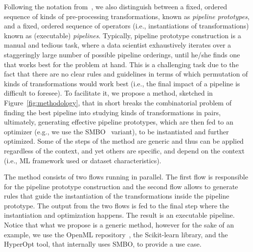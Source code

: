 Following the notation from~\cite{Quemy20InfSystems}, we also distinguish between a fixed, ordered sequence of kinds of pre-processing transformations, known as \textit{pipeline prototypes}, and a fixed, ordered sequence of operators (i.e., instantiations of transformations) known as (executable) \textit{pipelines}.
Typically, pipeline prototype construction is a manual and tedious task, where a data scientist exhaustively iterates over a staggeringly large number of possible pipeline orderings, until he/she finds one that works best for the problem at hand. This is a challenging task due to the fact that there are no clear rules and guidelines in terms of which permutation of kinds of transformations would work best (i.e., the final impact of a pipeline is difficult to foresee). To facilitate it, we propose a method, sketched in Figure~\ref{fig:methodology}, that in short breaks the combinatorial problem of finding the best pipeline into studying kinds of transformations in pairs, ultimately, generating effective pipeline prototypes, which are then fed to an optimizer (e.g., we use the SMBO~\cite{HyperOptICML13} variant), to be instantiated and further optimized.
Some of the steps of the method are generic and thus can be applied regardless of the context, and yet others are specific, and depend on the context (i.e., ML framework used or dataset characteristics).


The method consists of two flows running in parallel. The first flow is responsible for the pipeline prototype construction and the second flow allows to generate rules that guide the instantiation of the transformations inside the pipeline prototype. 
The output from the two flows is fed to the final step where the instantiation and optimization happens. The result is an executable pipeline. Notice that what we propose is a generic method, however for the sake of an example, we use the OpenML repository~\cite{OpenML2013}, the Scikit-learn library, and the HyperOpt tool, that internally uses SMBO, to provide a use case.

